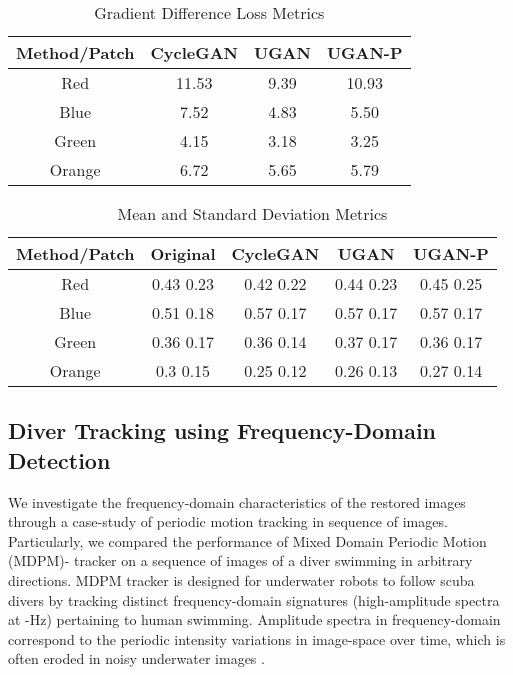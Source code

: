 \begin{table}[ht]
\footnotesize
\centering
\caption{Gradient Difference Loss Metrics}
\begin{tabular}{| c | c | c | c | }
   \hline
   Method/Patch & CycleGAN & \textbf{UGAN} & \textbf{UGAN-P} \\ \hline
   Red    & 11.53 & 9.39 & 10.93  \\ \hline
   Blue   & 7.52  & 4.83 &  5.50\\ \hline
   Green  & 4.15  & 3.18 & 3.25 \\ \hline
   Orange & 6.72  & 5.65 & 5.79 \\ \hline
\end{tabular}
\label{fig:gdl_tbl}
\end{table}

\begin{table*}[ht]
\centering
\caption{Mean and Standard Deviation Metrics}
\begin{tabular}{| c | c | c | c | c | }
   \hline
   Method/Patch & Original & CycleGAN & \textbf{UGAN} & \textbf{UGAN-P} \\ 
\hline
   Red & 0.43  0.23 & 0.42  0.22 & 0.44  0.23 & 0.45  0.25 \\ \hline
   Blue & 0.51  0.18 & 0.57  0.17 & 0.57  0.17 & 0.57  0.17 \\ \hline
   Green & 0.36  0.17 & 0.36  0.14 & 0.37  0.17 & 0.36  0.17 \\ \hline
   Orange & 0.3  0.15 & 0.25  0.12 & 0.26  0.13 & 0.27  0.14 \\ \hline
\end{tabular}
\label{fig:mean_tbl}
\end{table*}

\subsection{Diver Tracking using Frequency-Domain Detection}
We investigate the frequency-domain characteristics of the restored images through a case-study of periodic motion tracking in 
sequence of images. Particularly, we compared the performance of Mixed Domain Periodic Motion (MDPM)- tracker 
\cite{islam2017mixed} on a sequence of images of a diver swimming in  arbitrary directions. MDPM tracker is designed for 
underwater robots to follow scuba divers by   tracking distinct frequency-domain signatures (high-amplitude spectra at -Hz) 
pertaining to human swimming. Amplitude spectra in frequency-domain correspond to the periodic intensity variations in image-space 
over time, which is often eroded in noisy underwater images \cite{shkurti2017underwater}.

